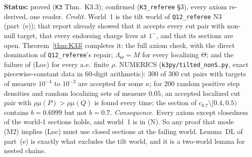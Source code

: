 \documentclass[11pt]{article}
\theoremstyle{definition}
\theoremstyle{remark}
\newcommand{\src}[1]{\texttt{#1}}
\newcommand{\status}[1]{\par\smallskip\noindent\textbf{Status:} #1\par\smallskip}
\begin{document}
\status{proved (\src{K3} Thm.~K3.3); confirmed (\src{K3\_referee} \S3), every axiom re-derived, one reader. \emph{Credit.} World~1 is the tilt world of \src{Q12\_referee} N3 (part~(e)); that report already showed that it accepts every cut pair with non-null target, that every endorsing charge lives at $1^-$, and that its sections are open. Theorem~\ref{thm:K33} completes it: the full axiom check, with the direct domination of \src{Q12\_referee}'s repair; $\Lambda_\Theta=M$ for every localizing $\Theta$; and the failure of (Loc) for every a.e.\ finite $\rho$. NUMERICS (\src{k3py/tilted\_nonS.py}, exact piecewise-constant data in 60-digit arithmetic): 300 of 300 cut pairs with targets of measure $10^{-4}$ to $10^{-2}$ are accepted for some $\kappa$; for 200 random positive step densities and random localizing sets of measure $0.05$, an accepted localized cut pair with $\rho\mu(P)>\rho\mu(Q)$ is found every time; the section of $c_{0.7}\setminus[0.4,0.5)$ contains $b=0.6999$ but not $b=0.7$. \emph{Consequence.} Every axiom except closedness of the world-1 sections holds, and world~1 is in (N). So any proof that mode (M2) implies (Loc) must use closed sections at the failing world. Lemma~DL of part~(e) is exactly what excludes the tilt world, and it is a two-world lemma for nested chains.}
\end{document}
